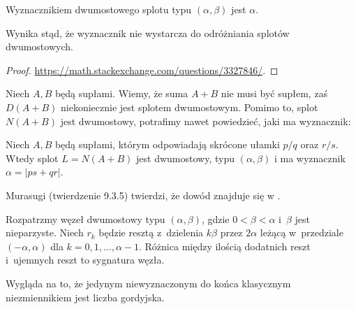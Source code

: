 \begin{proposition}
    \label{prp:tangle_determinant}
    Wyznacznikiem dwumostowego splotu typu $(\alpha, \beta)$ jest $\alpha$.
\end{proposition}

Wynika stąd, że wyznacznik nie wystarcza do odróżniania splotów dwumostowych.

\begin{proof}
    \url{https://math.stackexchange.com/questions/3327846/}.
\end{proof}

Niech $A, B$ będą supłami.
Wiemy, że suma $A+B$ nie musi być supłem, zaś $D(A+B)$ niekoniecznie jest splotem dwumostowym.
Pomimo to, splot $N(A+B)$ jest dwumostowy, potrafimy nawet powiedzieć, jaki ma wyznacznik:

\begin{proposition}
    \label{prp:tangle_determinant_correct}
    Niech $A, B$ będą supłami, którym odpowiadają skrócone ułamki $p/q$ oraz $r/s$.
    Wtedy splot $L = N(A+B)$ jest dwumostowy, typu $(\alpha, \beta)$ i ma wyznacznik $\alpha = |ps + qr|$.
\end{proposition}

Murasugi (twierdzenie 9.3.5) twierdzi, że dowód znajduje się w \cite{ernst90}.

\begin{proposition}
\label{prp:tangle_signature}
    Rozpatrzmy węzeł dwumostowy typu $(\alpha, \beta)$, gdzie $0 < \beta < \alpha$ i~$\beta$ jest nieparzyste.
    Niech $r_k$ będzie resztą z~dzielenia $k\beta$ przez $2\alpha$ leżącą w~przedziale $(-\alpha, \alpha)$ dla $k = 0, 1, \ldots, \alpha - 1$.
    Różnica między ilością dodatnich reszt i~ujemnych reszt to sygnatura węzła.
\end{proposition}

Wygląda na to, że jedynym niewyznaczonym do końca klasycznym niezmiennikiem jest liczba gordyjska.

